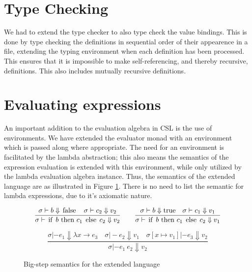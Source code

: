 \documentclass[10pt,a4paper,final,oneside,openany,article]{memoir}
\newcommand{\kw}[1]{\text{\lstinline{#1}}}
\begin{document}

\section{Type Checking}
We had to extend the type checker to also type check the value
bindings.  This is done by type checking the definitions in sequential
order of their appearence in a file, extending the typing environment
when each definition has been processed. This ensures that it is
impossible to make self-referencing, and thereby recursive,
definitions.  This also includes mutually recursive definitions.

\section{Evaluating expressions}
An important addition to the evaluation algebra in CSL is the use of
environments. We have extended the evaluator monad with an environment
which is passed along where appropriate. The need for an environment is
facilitated by the lambda abstraction; this also means the semantics of
the expression evaluation is extended with this environment, while only
utilized by the lambda evaluation algebra instance. Thus, the semantics
of the extended language are as illustrated in Figure
\ref{fig:bigstep_semantics}. There is no need to list the semantic for
lambda expressions, due to it's axiomatic nature.

\begin{figure}
\begin{equation*}
\frac{
  \sigma |- b \Downarrow \kw{false}
  \quad \sigma |- c_2 \Downarrow v_2
}{
  \sigma |- \kw{if} ~b ~\kw{then} ~c_1 ~\kw{else} ~c_2 \Downarrow v_2
}
\quad \quad
\frac{
  \sigma |- b \Downarrow \kw{true}
  \quad \sigma |- c_1 \Downarrow v_1
}{
  \sigma |- \kw{if} ~b ~\kw{then} ~c_1 ~\kw{else} ~c_2 \Downarrow v_1
}\label{eq:eval_condition}
\end{equation*}

\begin{equation*}
\frac{
  \sigma |- e_1 \Downarrow \lambda x \rightarrow e_3
  \quad \sigma |- e_2 \Downarrow v_1
  \quad \sigma[x\mapsto v_1] |- e_3 \Downarrow v_2
}{
  \sigma |- e_1 ~e_2 \Downarrow v_2
}\label{eq:eval_apply}
\end{equation*}

\caption{Big-step semantics for the extended language}
\label{fig:bigstep_semantics}
\end{figure}
\end{document}
